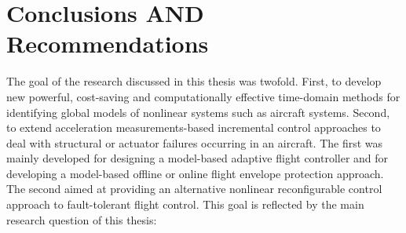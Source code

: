 \chapter{Conclusions AND Recommendations}
\label{Ch:conclusion}

%
%

The goal of the research discussed in this thesis was twofold. First, to develop new powerful, cost-saving and computationally effective time-domain methods for identifying global models of nonlinear systems such as aircraft systems. Second, to extend acceleration measurements-based incremental control approaches to deal with structural or actuator failures occurring in an aircraft. The first was mainly developed for designing a model-based adaptive flight controller and for developing a model-based offline or online flight envelope protection approach. The second aimed at providing an alternative nonlinear reconfigurable control approach to fault-tolerant flight control. This goal is reflected by the main research question of this thesis:\\


